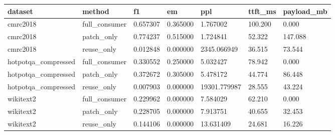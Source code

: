 \begin{tabular}{lllllll}
\toprule
dataset & method & f1 & em & ppl & ttft\_ms & payload\_mb \\
\midrule
cmrc2018 & full\_consumer & 0.657307 & 0.365000 & 1.767002 & 100.200 & 0.000 \\
cmrc2018 & patch\_only & 0.774237 & 0.515000 & 1.724841 & 52.322 & 147.088 \\
cmrc2018 & reuse\_only & 0.012848 & 0.000000 & 2345.066949 & 36.515 & 73.544 \\
hotpotqa\_compressed & full\_consumer & 0.330552 & 0.250000 & 5.032427 & 78.942 & 0.000 \\
hotpotqa\_compressed & patch\_only & 0.372672 & 0.305000 & 5.478172 & 44.774 & 86.448 \\
hotpotqa\_compressed & reuse\_only & 0.007903 & 0.000000 & 19301.779987 & 28.555 & 43.224 \\
wikitext2 & full\_consumer & 0.229962 & 0.000000 & 7.584029 & 62.210 & 0.000 \\
wikitext2 & patch\_only & 0.228705 & 0.000000 & 7.913751 & 40.655 & 32.453 \\
wikitext2 & reuse\_only & 0.144106 & 0.000000 & 13.631409 & 24.681 & 16.226 \\
\bottomrule
\end{tabular}
